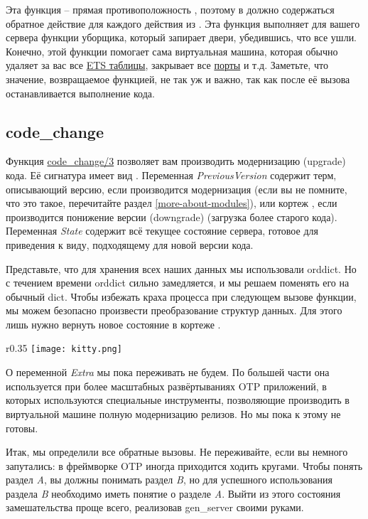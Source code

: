 Эта функция \--- прямая противоположность , поэтому в  должно содержаться обратное действие для каждого действия из .
Эта функция выполняет для вашего сервера функции уборщика, который запирает двери, убедившись, что все ушли. 
Конечно, этой функции помогает сама виртуальная машина, которая обычно удаляет за вас все \href{http://erldocs.com/R15B/stdlib/ets.html}{ETS таблицы}, закрывает все \href{http://www.erlang.org/doc/tutorial/c\_port.html}{порты} и т.д.
Заметьте, что значение, возвращаемое функцией, не так уж и важно, так как после её вызова останавливается выполнение кода.
\subsection{code\_change}
\label{code-change}
Функция \href{http://erldocs.com/R15B/stdlib/gen\_server.html#code\_change/3}{code\_change/3} позволяет вам производить модернизацию (upgrade) кода.
Её сигнатура имеет вид .
Переменная \emph{PreviousVersion} содержит терм, описывающий версию, если производится модернизация (если вы не помните, что это такое, перечитайте раздел \ref{more-about-modules}), или кортеж , если производится понижение версии (downgrade) (загрузка более старого кода).
Переменная \emph{State} содержит всё текущее состояние сервера, готовое для приведения к виду, подходящему для новой версии кода.

Представьте, что для хранения всех наших данных мы использовали orddict.
Но с течением времени orddict сильно замедляется, и мы решаем  поменять его на обычный dict.
Чтобы избежать краха процесса при следующем вызове функции, мы можем безопасно произвести преобразование структур данных.
Для этого лишь нужно вернуть новое состояние в кортеже .
\begin{wrapfigure}{r}{0.35\linewidth}
    \texttt{[image: kitty.png]}
\end{wrapfigure}

О переменной \emph{Extra} мы пока переживать не будем.
По большей части она используется при более масштабных развёртываниях OTP приложений, в которых используются специальные инструменты, позволяющие производить в виртуальной машине полную модернизацию релизов.
Но мы пока к этому не готовы.

Итак, мы определили все обратные вызовы.
Не переживайте, если вы немного запутались: в фреймворке OTP иногда приходится ходить кругами.
Чтобы понять раздел \emph{A}, вы должны понимать раздел \emph{B}, но для успешного использования раздела \emph{B} необходимо иметь понятие о разделе \emph{A}. 
Выйти из этого состояния замешательства проще всего, реализовав gen\_server своими руками.
